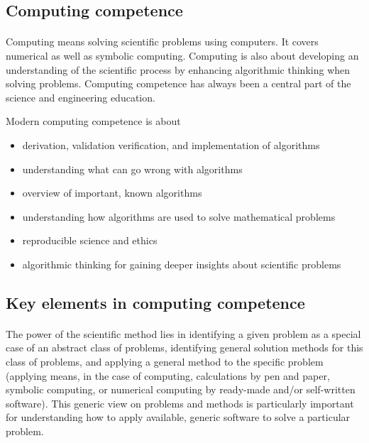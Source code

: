 \documentclass[%
oneside,                 %
final,                   %
10pt]{article}
\begin{document}
\subsection{Computing competence}

\paragraph{}
Computing means solving scientific problems using computers. It covers
numerical as well as symbolic computing. Computing is also about
developing an understanding of the scientific process by enhancing
algorithmic thinking when solving problems.  Computing competence has
always been a central part of the science and engineering
education.

Modern computing competence is about

\begin{itemize}
\item derivation, validation verification, and implementation of algorithms

\item understanding what can go wrong with algorithms

\item overview of important, known algorithms

\item understanding how algorithms are used to solve mathematical problems

\item reproducible science and ethics

\item algorithmic thinking for gaining deeper insights about scientific problems
\end{itemize}

\noindent




\subsection{Key elements in computing competence}

\paragraph{}
The power of the scientific method lies in identifying a given problem
as a special case of an abstract class of problems, identifying
general solution methods for this class of problems, and applying a
general method to the specific problem (applying means, in the case of
computing, calculations by pen and paper, symbolic computing, or
numerical computing by ready-made and/or self-written software). This
generic view on problems and methods is particularly important for
understanding how to apply available, generic software to solve a
particular problem.
\end{document}
